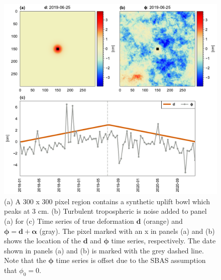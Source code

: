 %


\begin{figure}[!h]
	\centering
	\includegraphics[width=.99\textwidth]{figures/chapter5-lowess/figure2-demo-data.pdf}
	\caption[Synthetic data for LOWESS smoothing]{
		(a)  A 300 x 300 pixel region contains a synthetic uplift bowl which peaks at 3 cm.
		(b) Turbulent tropospheric is noise added to panel (a) for 
		(c) Time series of true deformation $\bm{d}$ (orange) and $\bm{\phi} =\bm{d} + \bm{\alpha}$ (gray). The pixel marked with an x in panels (a) and (b) shows the location of the $\bm{d}$ and $\bm{\phi}$ time series, respectively.
		The date shown in panels (a) and (b) is marked with the grey dashed line. Note that the $ \bm{\phi} $ time series is offset due to the SBAS assumption that $ \phi_0 = 0 $.
	}
	\label{fig:ch5-demo-data}
\end{figure}

